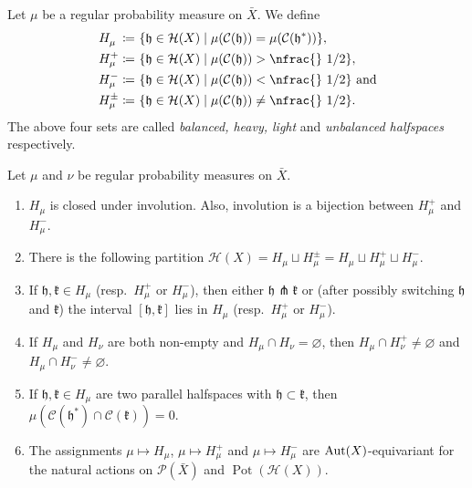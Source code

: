 \begin{defin}
  \label{defin:weight}
  Let \(\mu\) be a regular probability measure on \(\bar X\). We define
  \begin{align*}
    H_\mu^{\phantom{+}} \coloneqq &\ \{\mathfrak{h} \in \mathcal{H}(X) \mid \mu(\mathcal{C}(\mathfrak{h})) = \mu(\mathcal{C}(\mathfrak{h}^\ast))\},\\
    H_\mu^+ \coloneqq &\ \{\mathfrak{h} \in \mathcal{H}(X) \mid \mu(\mathcal{C}(\mathfrak{h})) > \text{\nfrac{} 1/2} \},\\
    H_\mu^- \coloneqq &\ \{\mathfrak{h} \in \mathcal{H}(X) \mid \mu(\mathcal{C}(\mathfrak{h})) < \text{\nfrac{} 1/2}\} \text{ and}\\
    H_\mu^\pm \coloneqq &\ \{\mathfrak{h} \in \mathcal{H}(X) \mid \mu(\mathcal{C}(\mathfrak{h})) \neq \text{\nfrac{} 1/2}\}.
  \end{align*} 
  The above four sets are called \emph{balanced, heavy, light} and \emph{unbalanced halfspaces} respectively.
\end{defin}

\begin{lemma}[{\cite[Lemma\ 4.6]{MR3509968}}]
  \label{lem:4.6}
  Let \(\mu\) and \(\nu\) be regular probability measures on  \(\bar X\).
  \begin{enumerate}
  \item \(H_\mu\) is closed under involution. Also, involution is a bijection between \(H_\mu^+\) and \(H_\mu^-\).
  \item There is the following partition \(\mathcal{H}(X) = H_\mu \sqcup H_\mu^\pm = H_\mu \sqcup H_\mu^+ \sqcup H_\mu^-\).
  \item If \(\mathfrak{h, k} \in H_\mu\) (resp.\ \(H_\mu^+\) or \(H_\mu^-\)), then either \(\mathfrak{h} \pitchfork \mathfrak{k}\) or (after possibly switching \(\mathfrak{h}\) and \(\mathfrak{k}\)) the interval \([\mathfrak{h}, \mathfrak{k}]\) lies in \(H_\mu\) (resp.\ \(H_\mu^+\) or \(H_\mu^-\)).
  \item If \(H_\mu\) and \(H_\nu\) are both non-empty and \(H_\mu \cap H_\nu = \varnothing\), then \(H_\mu \cap H_\nu^+ \neq \varnothing\) and \(H_\mu \cap H_\nu^- \neq \varnothing\).
  \item If \(\mathfrak{h, k}  \in H_\mu\) are two parallel halfspaces with \(\mathfrak{h} \subset \mathfrak{k}\), then \(\mu(\mathcal{C}(\mathfrak{h}^\ast) \cap \mathcal{C}(\mathfrak{k})) = 0\).
  \item The assignments \(\mu \mapsto H_\mu\), \(\mu \mapsto H_\mu^+\) and \(\mu \mapsto H_\mu^-\) are \(\operatorname{Aut}(X)\)-equivariant for the natural actions on \(\mathcal{P}(\bar X)\) and \(\operatorname{Pot}(\mathcal{H}(X))\).
  \end{enumerate}
\end{lemma}


